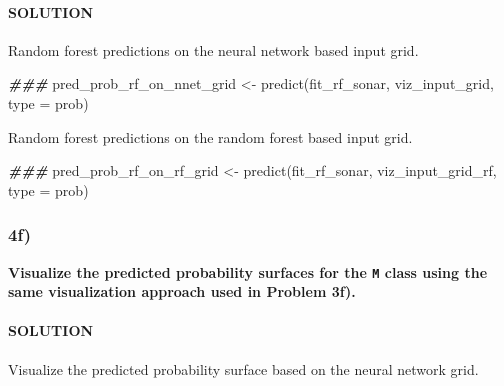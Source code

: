 \documentclass[
]{article}
\newenvironment{Shaded}{\begin{snugshade}}{\end{snugshade}}
\newcommand{\AttributeTok}[1]{\textcolor[rgb]{0.77,0.63,0.00}{#1}}
\newcommand{\DocumentationTok}[1]{\textcolor[rgb]{0.56,0.35,0.01}{\textbf{\textit{#1}}}}
\newcommand{\FunctionTok}[1]{\textcolor[rgb]{0.00,0.00,0.00}{#1}}
\newcommand{\NormalTok}[1]{#1}
\newcommand{\OtherTok}[1]{\textcolor[rgb]{0.56,0.35,0.01}{#1}}
\newcommand{\StringTok}[1]{\textcolor[rgb]{0.31,0.60,0.02}{#1}}
\begin{document}
\hypertarget{solution-21}{%
\paragraph{SOLUTION}\label{solution-21}}

Random forest predictions on the neural network based input grid.

\begin{Shaded}
\begin{Highlighting}[]
\DocumentationTok{\#\#\#}
\NormalTok{pred\_prob\_rf\_on\_nnet\_grid }\OtherTok{\textless{}{-}} \FunctionTok{predict}\NormalTok{(fit\_rf\_sonar, viz\_input\_grid, }\AttributeTok{type =} \StringTok{\textquotesingle{}prob\textquotesingle{}}\NormalTok{)}
\end{Highlighting}
\end{Shaded}

Random forest predictions on the random forest based input grid.

\begin{Shaded}
\begin{Highlighting}[]
\DocumentationTok{\#\#\#}
\NormalTok{pred\_prob\_rf\_on\_rf\_grid }\OtherTok{\textless{}{-}} \FunctionTok{predict}\NormalTok{(fit\_rf\_sonar, viz\_input\_grid\_rf, }\AttributeTok{type =} \StringTok{\textquotesingle{}prob\textquotesingle{}}\NormalTok{)}
\end{Highlighting}
\end{Shaded}

\hypertarget{f-2}{%
\subsubsection{4f)}\label{f-2}}

\textbf{Visualize the predicted probability surfaces for the \texttt{M}
class using the same visualization approach used in Problem 3f).}

\hypertarget{solution-22}{%
\paragraph{SOLUTION}\label{solution-22}}

Visualize the predicted probability surface based on the neural network
grid.
\end{document}
